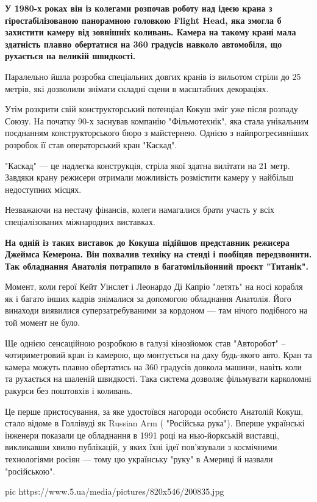 {\bfseries
У 1980-х роках він із колегами розпочав роботу над ідеєю крана з
гіростабілізованою панорамною головкою Flight Head, яка змогла б
захистити камеру від зовнішніх коливань. Камера на такому крані мала
здатність плавно обертатися на 360 градусів навколо автомобіля, що
рухається на великій швидкості.
}

Паралельно йшла розробка спеціальних довгих кранів із вильотом стріли до
25 метрів, які дозволили знімати складні сцени в масштабних декораціях.

Утім розкрити свій конструкторський потенціал Кокуш зміг уже після розпаду
Союзу. На початку 90-х заснував компанію "Фільмотехнік", яка стала
унікальним поєднанням конструкторського бюро з майстернею. Однією з
найпрогресивніших розробок її став операторський кран "Каскад".

"Каскад" --- це надлегка конструкція, стріла якої здатна вилітати на 21
метр. Завдяки крану режисери отримали можливість розмістити камеру у
найбільш недоступних місцях.

Незважаючи на нестачу фінансів, колеги намагалися брати участь у всіх
спеціалізованих міжнародних виставках.

{\bfseries
На одній із таких виставок до Кокуша підійшов представник режисера
Джеймса Кемерона. Він похвалив техніку на стенді і пообіцяв
передзвонити. Так обладнання Анатолія потрапило в багатомільйонний
проєкт "Титанік".
}

Момент, коли герої Кейт Уінслет і Леонардо Ді Капріо "летять" на носі
корабля як і багато інших кадрів знімалися за допомогою обладнання
Анатолія. Його винаходи виявилися суперзатребуваними за кордоном --- там
нічого подібного на той момент не було.

Ще однією сенсаційною розробкою в галузі кінозйомок став "Авторобот" –
чотириметровий кран із камерою, що монтується на даху будь-якого авто.
Кран та камера можуть плавно обертатись на 360 градусів довкола машини,
навіть коли та рухається на шаленій швидкості. Така система дозволяє
фільмувати карколомні ракурси без поштовхів і коливань.

Це перше пристосування, за яке удостоївся нагороди особисто Анатолій
Кокуш, стало відоме в Голлівуді як Russian Arm ( "Російська рука"). Вперше
українські інженери показали це обладнання в 1991 році на нью-йоркській
виставці, викликавши хвилю публікацій, у яких їхні ідеї пов'язували з
космічними технологіями росіян --- тому цю українську "руку" в Америці й
назвали "російською". 

\ifcmt
pic https://www.5.ua/media/pictures/820x546/200835.jpg
\fi

